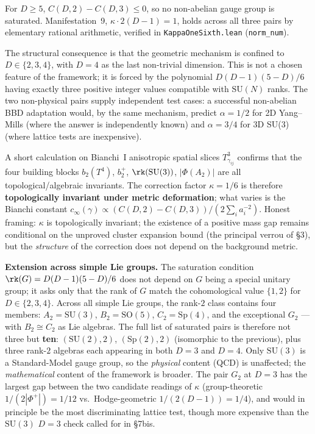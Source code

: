 \documentclass[11pt,a4paper]{article}
\newcommand{\SU}[1]{\mathrm{SU}(#1)}
\newcommand{\cinf}{c_\infty}
\begin{document}
For $D \ge 5$, $C(D,2) - C(D,3) \le 0$, so no non-abelian gauge group is saturated. Manifestation~9, $\kappa \cdot 2(D-1) = 1$, holds across all three pairs by elementary rational arithmetic, verified in \texttt{KappaOneSixth.lean} (\texttt{norm\_num}).

The structural consequence is that the geometric mechanism is confined to $D \in \{2, 3, 4\}$, with $D = 4$ as the last non-trivial dimension. This is not a chosen feature of the framework; it is forced by the polynomial $D(D-1)(5-D)/6$ having exactly three positive integer values compatible with $\SU{N}$ ranks. The two non-physical pairs supply independent test cases: a successful non-abelian BBD adaptation would, by the same mechanism, predict $\alpha = 1/2$ for 2D Yang--Mills (where the answer is independently known) and $\alpha = 3/4$ for 3D SU(3) (where lattice tests are inexpensive).

\smallskip
A short calculation on Bianchi~I anisotropic spatial slices $T^3_{\gamma_{ij}}$ confirms that the four building blocks $b_2(T^4)$, $b_2^+$, $\rk(\SU{3})$, $|\Phi(A_2)|$ are all topological/algebraic invariants. The correction factor $\kappa = 1/6$ is therefore \textbf{topologically invariant under metric deformation}; what varies is the Bianchi constant $\cinf(\gamma) \propto (C(D,2)-C(D,3)) / (2 \sum_i a_i^{-2})$. Honest framing: $\kappa$ is topologically invariant; the existence of a positive mass gap remains conditional on the unproved cluster expansion bound (the principal verrou of \S 3), but the \emph{structure} of the correction does not depend on the background metric.

\smallskip
\textbf{Extension across simple Lie groups.} The saturation condition $\rk(G) = D(D-1)(5-D)/6$ does not depend on $G$ being a special unitary group; it asks only that the rank of $G$ match the cohomological value $\{1, 2\}$ for $D \in \{2, 3, 4\}$. Across all simple Lie groups, the rank-$2$ class contains four members: $A_2 = \SU{3}$, $B_2 = \mathrm{SO}(5)$, $C_2 = \mathrm{Sp}(4)$, and the exceptional $G_2$ --- with $B_2 \cong C_2$ as Lie algebras. The full list of saturated pairs is therefore not three but \textbf{ten}: $(\SU{2}, 2)$, $(\mathrm{Sp}(2), 2)$ (isomorphic to the previous), plus three rank-$2$ algebras each appearing in both $D = 3$ and $D = 4$. Only $\SU{3}$ is a Standard-Model gauge group, so the \emph{physical} content (QCD) is unaffected; the \emph{mathematical} content of the framework is broader. The pair $G_2$ at $D = 3$ has the largest gap between the two candidate readings of $\kappa$ (group-theoretic $1/(2|\Phi^+|) = 1/12$ vs.\ Hodge-geometric $1/(2(D-1)) = 1/4$), and would in principle be the most discriminating lattice test, though more expensive than the $\SU{3}$ $D = 3$ check called for in \S 7bis.
\end{document}
